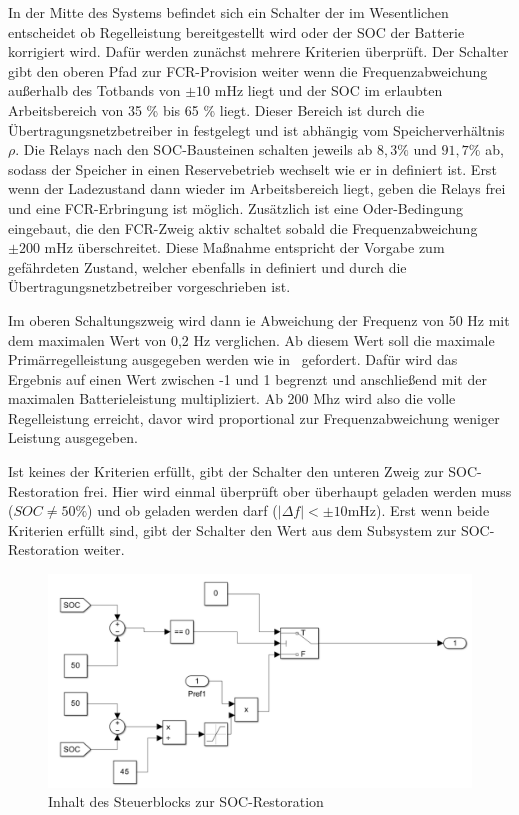 In der Mitte des Systems befindet sich ein Schalter der im Wesentlichen entscheidet ob Regelleistung bereitgestellt wird
oder der SOC der Batterie korrigiert wird.
Dafür werden zunächst mehrere Kriterien überprüft.
Der Schalter gibt den oberen Pfad zur FCR-Provision weiter wenn die Frequenzabweichung außerhalb des Totbands von $\pm 10$ mHz liegt
und der SOC im erlaubten Arbeitsbereich von 35 \% bis 65 \% liegt.
Dieser Bereich ist durch die Übertragungsnetzbetreiber in \parencite[]{Reservebetrieb} festgelegt und ist abhängig vom Speicherverhältnis $\rho$.
Die Relays nach den SOC-Bausteinen schalten jeweils ab $8,3 \%$ und $91,7 \%$ ab, sodass der Speicher in einen Reservebetrieb wechselt wie er in \parencite[]{Reservebetrieb}
definiert ist.
Erst wenn der Ladezustand dann wieder im Arbeitsbereich liegt, geben die Relays frei und eine FCR-Erbringung ist möglich.
Zusätzlich ist eine Oder-Bedingung eingebaut, die den FCR-Zweig aktiv schaltet sobald die Frequenzabweichung $\pm 200$ mHz überschreitet.
Diese Maßnahme entspricht der Vorgabe zum gefährdeten Zustand, welcher ebenfalls in \parencite[]{Reservebetrieb} definiert 
und durch die Übertragungsnetzbetreiber vorgeschrieben ist.

Im oberen Schaltungszweig wird dann ie Abweichung der Frequenz von 50 Hz mit dem maximalen Wert von 0,2 Hz verglichen.
Ab diesem Wert soll die maximale Primärregelleistung ausgegeben werden wie in~\parencite[Kap. 3.1]{Regelleistung} gefordert.
Dafür wird das Ergebnis auf einen Wert zwischen -1 und 1 begrenzt und anschließend 
mit der maximalen Batterieleistung multipliziert.
Ab 200 Mhz wird also die volle Regelleistung erreicht, davor wird proportional zur Frequenzabweichung
weniger Leistung ausgegeben.

Ist keines der Kriterien erfüllt, gibt der Schalter den unteren Zweig zur SOC-Restoration frei.
Hier wird einmal überprüft ober überhaupt geladen werden muss ($SOC \neq 50 \%$) und ob geladen werden darf ($|\Delta f| < \pm 10 \text{mHz}$).
Erst wenn beide Kriterien erfüllt sind, gibt der Schalter den Wert aus dem Subsystem zur SOC-Restoration weiter.

\begin{figure}[h!]
	\centering
	\includegraphics[width=12cm]{Abbildungen/SOC-Rest.png}
	\caption{Inhalt des Steuerblocks zur SOC-Restoration}\label{SOC-Rest}
\end{figure}

